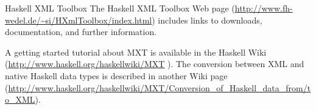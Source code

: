 \begin{hcarentry}[updated]{Haskell XML Toolbox}
\FurtherReading
The Haskell XML Toolbox Web page
(\url{http://www.fh-wedel.de/~si/HXmlToolbox/index.html})
includes links to downloads,  documentation, and further information.

A getting started tutorial about MXT is available
 in the Haskell Wiki (\url{http://www.haskell.org/haskellwiki/MXT}
). The conversion between XML and native Haskell data types is
described in another Wiki page
(\url{http://www.haskell.org/haskellwiki/MXT/Conversion_of_Haskell_data_from/to_XML}).
\end{hcarentry}
